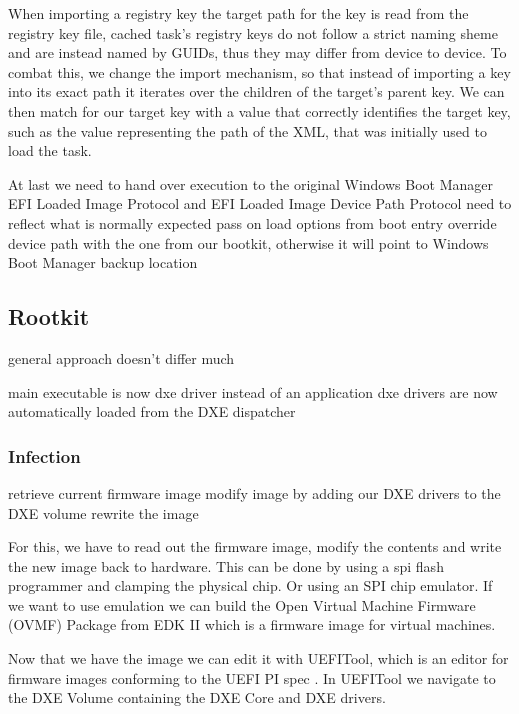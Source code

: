 When importing a registry key the target path for the key is read from the registry key file, cached task's registry keys do not follow a strict naming sheme and are instead named by GUIDs, thus they may differ from device to device. To combat this, we change the import mechanism, so that instead of importing a key into its exact path it iterates over the children of the target's parent key. We can then match for our target key with a value that correctly identifies the target key, such as the value representing the path of the XML, that was initially used to load the task.

At last we need to hand over execution to the original Windows Boot Manager
EFI Loaded Image Protocol \cite[9.1]{uefi-spec} and EFI Loaded Image Device Path Protocol \cite[9.2]{uefi-spec}
need to reflect what is normally expected
pass on load options from boot entry
override device path with the one from our bootkit, otherwise it will point to Windows Boot Manager backup location


\subsection{Rootkit}

general approach doesn't differ much

main executable is now dxe driver instead of an application
dxe drivers are now automatically loaded from the DXE dispatcher

\subsubsection{Infection}

retrieve current firmware image
modify image by adding our DXE drivers to the DXE volume
rewrite the image

For this, we have to read out the firmware image, modify the contents and write the new image back to hardware. This can be done by using a spi flash programmer and clamping the physical chip. Or using an SPI chip emulator. 
If we want to use emulation we can build the Open Virtual Machine Firmware (OVMF) Package from EDK II which is a firmware image for virtual machines.

Now that we have the image we can edit it with UEFITool, which is an editor for firmware images conforming to the UEFI PI spec \cite{uefitool}.
In UEFITool we navigate to the DXE Volume containing the DXE Core and DXE drivers.

